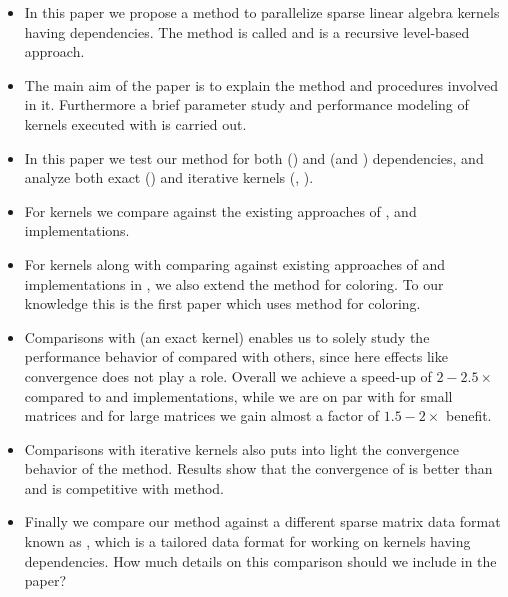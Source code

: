 \begin{itemize}
\item In this paper we propose a method to parallelize sparse linear algebra kernels having dependencies. The method is called \RACE and is a recursive level-based approach.  

\item The main aim of the paper is to explain the \RACE method and procedures involved in it. Furthermore a brief parameter study and performance modeling of kernels executed with \RACE is carried out.

\item In this paper we test our method for both \DONE (\GS) and \DTWO (\SymmSpmv and \KACZ) dependencies, and analyze both exact (\SymmSpmv) and iterative kernels (\GS, \KACZ).

\item For \DONE kernels we compare against the existing approaches of \MC \cite{MC}, \ABMC \cite{ABMC} and \MKL \cite{MKL} implementations.

\item For \DTWO kernels along with comparing against existing approaches of \MC \cite{feast_mc} and implementations in \MKL \cite{MKL}, we also extend the \ABMC method for \DTWO coloring. To our knowledge this is the first paper which uses \ABMC method for \DTWO coloring.

\item Comparisons with \SymmSpmv (an exact kernel) enables us to solely study the performance behavior of \RACE compared with others, since here effects like convergence does not play a role. Overall we achieve a speed-up of $2-2.5 \times$ compared to \MC and \MKL implementations, while we are on par with \ABMC for small matrices and for large matrices we gain almost a factor of $1.5-2 \times$ benefit. 

\item Comparisons with iterative kernels also puts into light the convergence behavior of the method. Results show that the convergence of \RACE is better than \MC and is competitive with \ABMC method.

\item Finally we compare our method against a different sparse matrix data format known as \RSB, which is a tailored data format for working on kernels having dependencies. How much details on this comparison should we include in the paper? 
\end{itemize}